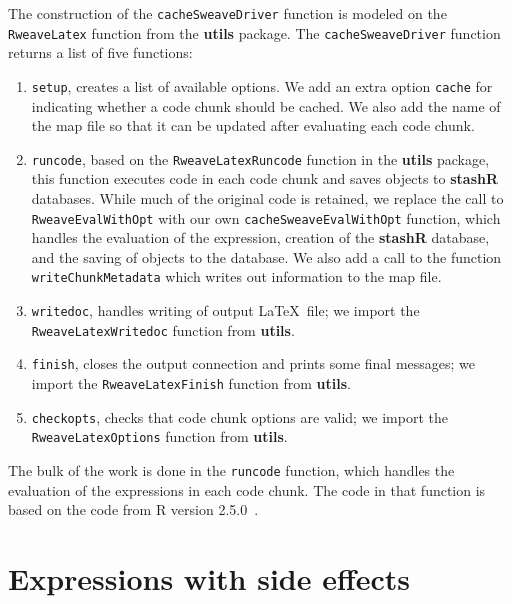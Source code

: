 \documentclass{article}
\newcommand{\proglang}{\textsf}
\newcommand{\code}{\texttt}
\newcommand{\pkg}{\textbf}
\begin{document}
The construction of the \code{cacheSweaveDriver} function is modeled
on the \code{RweaveLatex} function from the \pkg{utils} package.  The
\code{cacheSweaveDriver} function returns a list of five functions:
\begin{enumerate}
\item
\code{setup}, creates a list of available options.  We add an extra
option \code{cache} for indicating whether a code chunk should be
cached.  We also add the name of the map file so that it can be
updated after evaluating each code chunk.
\item
\code{runcode}, based on the \code{RweaveLatexRuncode} function in the
\pkg{utils} package, this function executes code in each code chunk
and saves objects to \pkg{stashR} databases. While much of the
original code is retained, we replace the call to
\code{RweaveEvalWithOpt} with our own \code{cacheSweaveEvalWithOpt}
function, which handles the evaluation of the expression, creation of
the \pkg{stashR} database, and the saving of objects to the database.
We also add a call to the function \code{writeChunkMetadata} which writes
out information to the map file.
\item
\code{writedoc}, handles writing of output \LaTeX\ file; we import the
\code{RweaveLatexWritedoc} function from \pkg{utils}.
\item
\code{finish}, closes the output connection and prints some final
messages; we import the \code{RweaveLatexFinish} function from
\pkg{utils}.
\item
\code{checkopts}, checks that code chunk options are valid; we import
the \code{RweaveLatexOptions} function from \pkg{utils}.
\end{enumerate}

The bulk of the work is done in the \code{runcode} function, which
handles the evaluation of the expressions in each code chunk.  The
code in that function is based on the code from \proglang{R} version
2.5.0~\citep{r:2007}.


\section{Expressions with side effects}
\end{document}
